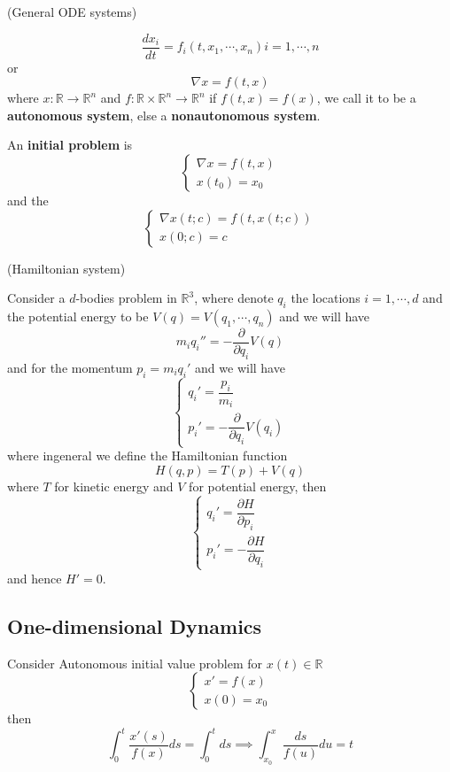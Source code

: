 \documentclass{article}
\begin{document}
\begin{definition}(General ODE systems)\par
    \[\dfrac{dx_i}{dt} = f_i(t,x_1,\cdots,x_n) i = 1, \cdots,n\]
    or
    \[\nabla x = f(t,x)\]
    where $x:\mathbb{R} \to\mathbb{R}^n$ and $f:\mathbb{R}\times\mathbb{R}^n \to \mathbb{R}^n$
    if $f(t,x) = f(x)$, we call it to be a \textbf{autonomous system}, else a \textbf{nonautonomous system}.\par
    An \textbf{initial problem} is
    \[
    \begin{cases}
        \nabla x = f(t,x) \\
        x(t_0) = x_0
    \end{cases}
    \]
    and the 
    \[
    \begin{cases}
        \nabla x(t;c) = f(t,x(t;c)) \\
        x(0;c) = c
    \end{cases}
    \]
\end{definition}

\begin{example}(Hamiltonian system)\par
    Consider a $d$-bodies problem in $\mathbb{R}^3$, where denote $q_i$ the locations $i=1,\cdots, d$ and the potential energy to be $V(q) = V(q_1,\cdots,q_n)$ and we will have
    \[m_iq_i'' = -\dfrac{\partial}{\partial q_i}V(q)\]
    and for the momentum $p_i = m_iq_i'$ and we will have
    \[
    \begin{cases}
        q_i' = \dfrac{p_i}{m_i} \\
        p_i' = -\dfrac{\partial}{\partial q_i}V(q_i)
    \end{cases}
    \]
    where ingeneral we define the Hamiltonian function
    \[
    H(q,p) = T(p) + V(q)
    \]
    where $T$ for kinetic energy and $V$ for potential energy, then
    \[
    \begin{cases}
        q_i' = \dfrac{\partial H}{\partial p_i} \\
        p_i' = -\dfrac{\partial H}{\partial q_i}
    \end{cases}
    \]
    and hence $H' = 0$.
\end{example}

\subsection{One-dimensional Dynamics}

Consider Autonomous initial value problem for $x(t)\in \mathbb{R}$
\[
\begin{cases}
    x' = f(x) \\
    x(0) = x_0
\end{cases}
\]
then
\[
\int_0^t \dfrac{x'(s)}{f(x)} ds = \int_0^t ds \implies \int_{x_0}^x \dfrac{ds}{f(u)} du = t
\]
\end{document}
